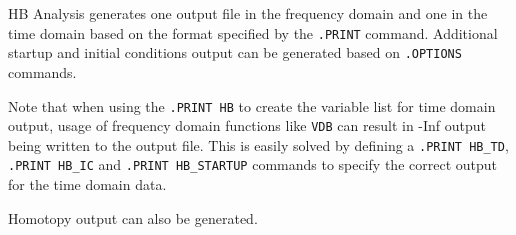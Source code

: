 

HB Analysis generates one output file in the frequency domain and one in the
time domain based on the format specified by the \texttt{.PRINT}
command.  Additional startup and initial conditions output can be
generated based on \texttt{.OPTIONS} commands.

Note that when using the \texttt{.PRINT HB} to create the variable list
for time domain output, usage of frequency domain functions like \texttt{VDB} can
result in -Inf output being written to the output file.  This is easily
solved by defining a \texttt{.PRINT HB\_TD}, \texttt{.PRINT HB\_IC} and
\texttt{.PRINT HB\_STARTUP} commands to specify the correct output for
the time domain data.

Homotopy output can also be generated.

